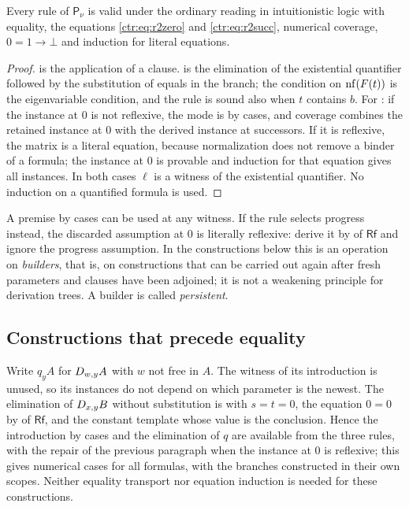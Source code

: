 \begin{proposition}[Soundness]
\label{wit:prop:P-sound}
Every rule of $\mathsf{P}_{\nu}$ is valid under the ordinary reading in
intuitionistic logic with equality, the equations \eqref{ctr:eq:r2zero} and \eqref{ctr:eq:r2succ},
numerical coverage, $0=1\to\bot$ and induction for literal equations.
\end{proposition}

\begin{proof}
 is the application of a clause.   is the
elimination of the existential quantifier followed by the substitution of
equals in the branch; the condition on $\operatorname{nf}(F(t))$ is the eigenvariable
condition, and the rule is sound also when $t$ contains $b$.  For
: if the instance at $0$ is not reflexive, the mode is by
cases, and coverage combines the retained instance at $0$ with the derived
instance at successors.  If it is reflexive, the matrix is a literal
equation, because normalization does not remove a binder of a formula; the
instance at $0$ is provable and induction for that equation gives all
instances.  In both cases $\ell$ is a witness of the existential
quantifier.  No induction on a quantified formula is used.
\end{proof}

A premise by cases can be used at any witness.  If the rule selects progress
instead, the discarded assumption at $0$ is literally reflexive: derive it
by  of $\mathsf{Rf}$ and ignore the progress assumption.  In
the constructions below this is an operation on \emph{builders}, that is, on
constructions that can be carried out again after fresh parameters and
clauses have been adjoined; it is not a weakening principle for derivation
trees.  A builder is called \emph{persistent}.

\subsection{Constructions that precede equality}

Write $q_yA$ for $D_{w,y}A$ with $w$ not free in $A$.  The witness of its
introduction is unused, so its instances do not depend on which parameter is
the newest.  The elimination of $D_{x,y}B$ without substitution is
 with $s=t=0$, the equation $0=0$ by  of
$\mathsf{Rf}$, and the constant template whose value is the conclusion.
Hence the introduction by cases and the elimination of $q$ are available
from the three rules, with the repair of the previous paragraph when the
instance at $0$ is reflexive; this gives numerical cases for all formulas,
with the branches constructed in their own scopes.  Neither equality
transport nor equation induction is needed for these constructions.

